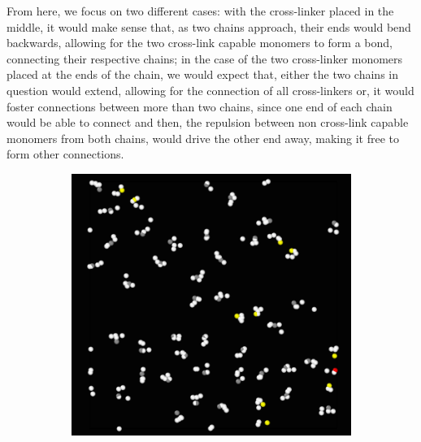 \documentclass[../../main.tex]{subfiles}
\begin{document}
    From here, we focus on two different cases: with the cross-linker placed in the middle, it would make sense that, as two chains approach, their ends would bend backwards, allowing for the two cross-link capable monomers to form a bond, connecting their respective chains; in the case of the two cross-linker monomers placed at the ends of the chain, we would expect that, either the two chains in question would extend, allowing for the connection of all cross-linkers or, it would foster connections between more than two chains, since one end of each chain would be able to connect and then, the repulsion between non cross-link capable monomers from both chains, would drive the other end away, making it free to form other connections. 
        \begin{figure}[h]
            \centering
            \begin{subfigure}[b]{0.47\textwidth}
                \centering
                \includegraphics[width=\textwidth]{Figures/middle_ovito.png}
                \caption{}
                \label{fig: ovito - repel - middle}
            \end{subfigure}
            \hfill
            \begin{subfigure}[b]{0.47\textwidth}
                \centering

\end{subfigure}
\end{figure}
\end{document}
